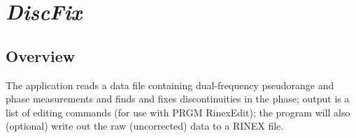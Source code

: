 %
%


\section{\emph{DiscFix}}
\subsection{Overview}
The application reads a data file containing dual-frequency pseudorange and phase
   measurements and finds and fixes discontinuities in the phase; output is
   a list of editing commands (for use with PRGM RinexEdit); the program will
   also (optional) write out the raw (uncorrected) data to a RINEX file.

